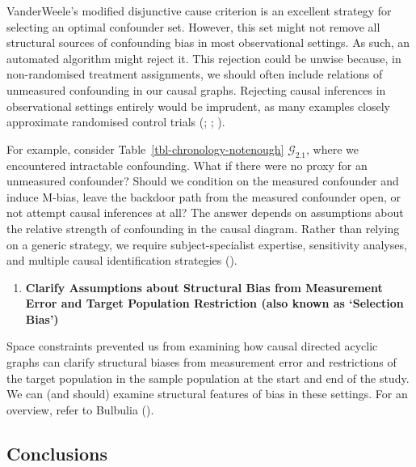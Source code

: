 \documentclass[
  single column]{article}
\providecommand{\tightlist}{%
  \setlength{\itemsep}{0pt}\setlength{\parskip}{0pt}}\usepackage{longtable,booktabs,array}
\begin{document}
VanderWeele's modified disjunctive cause criterion is an excellent
strategy for selecting an optimal confounder set. However, this set
might not remove all structural sources of confounding bias in most
observational settings. As such, an automated algorithm might reject it.
This rejection could be unwise because, in non-randomised treatment
assignments, we should often include relations of unmeasured confounding
in our causal graphs. Rejecting causal inferences in observational
settings entirely would be imprudent, as many examples closely
approximate randomised control trials
(; ; ).

For example, consider Table~\ref{tbl-chronology-notenough}
\(\mathcal{G}_{2.1}\), where we encountered intractable confounding.
What if there were no proxy for an unmeasured confounder? Should we
condition on the measured confounder and induce M-bias, leave the
backdoor path from the measured confounder open, or not attempt causal
inferences at all? The answer depends on assumptions about the relative
strength of confounding in the causal diagram. Rather than relying on a
generic strategy, we require subject-specialist expertise, sensitivity
analyses, and multiple causal identification strategies
().

\begin{enumerate}
\def\labelenumi{\arabic{enumi}.}
\setcounter{enumi}{11}
\tightlist
\item
  \textbf{Clarify Assumptions about Structural Bias from Measurement
  Error and Target Population Restriction (also known as `Selection
  Bias')}
\end{enumerate}

Space constraints prevented us from examining how causal directed
acyclic graphs can clarify structural biases from measurement error and
restrictions of the target population in the sample population at the
start and end of the study. We can (and should) examine structural
features of bias in these settings. For an overview, refer to Bulbulia
().

\subsection{Conclusions}\label{id-sec-6}
\end{document}
